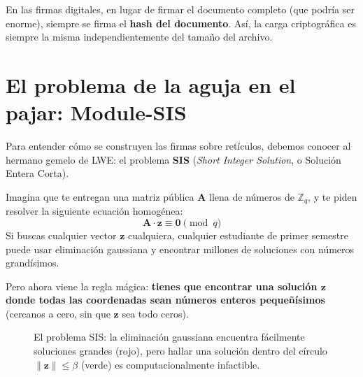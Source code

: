 En las firmas digitales, en lugar de firmar el documento completo (que podría ser enorme), siempre se firma el \textbf{hash del documento}. Así, la carga criptográfica es siempre la misma independientemente del tamaño del archivo.

\section{El problema de la aguja en el pajar: Module-SIS}

Para entender cómo se construyen las firmas sobre retículos, debemos conocer al hermano gemelo de LWE: el problema \textbf{SIS} (\textit{Short Integer Solution}, o Solución Entera Corta).

\begin{intuicion}
Imagina que te entregan una matriz pública $\mathbf{A}$ llena de números de $\mathbb{Z}_q$, y te piden resolver la siguiente ecuación homogénea:
\[
\mathbf{A} \cdot \mathbf{z} \equiv \mathbf{0} \pmod q
\]
Si buscas cualquier vector $\mathbf{z}$ cualquiera, cualquier estudiante de primer semestre puede usar eliminación gaussiana y encontrar millones de soluciones con números grandísimos.

Pero ahora viene la regla mágica: \textbf{tienes que encontrar una solución $\mathbf{z}$ donde todas las coordenadas sean números enteros pequeñísimos} (cercanos a cero, sin que $\mathbf{z}$ sea todo ceros).
\end{intuicion}

\begin{figure}[htbp]
\centering
{}
\caption{El problema SIS: la eliminación gaussiana encuentra fácilmente soluciones grandes (rojo), pero hallar una solución dentro del círculo $\|\mathbf{z}\| \le \beta$ (verde) es computacionalmente infactible.}
\label{fig:sis_geometria}
\end{figure}

